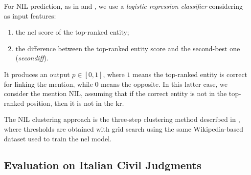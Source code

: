 For NIL prediction, as in \textcite{ijckg2022} and , we use a \textit{logistic regression classifier} considering as input features:
\begin{enumerate}
    \item the \ac{nel} score of the top-ranked entity;
    \item the difference between the top-ranked entity score and the second-best one (\textit{secondiff}).
\end{enumerate}
It produces an output $p \in [0,1]$, where $1$ means the top-ranked entity is correct for linking the mention, while $0$ means the opposite. In this latter case, we consider the mention NIL, assuming that if the correct entity is not in the top-ranked position, then it is not in the \ac{kr}.


The NIL clustering approach is the three-step clustering method described in , where thresholds are obtained with grid search using the same Wikipedia-based dataset used to train the \ac{nel} model.







\subsection{Evaluation on Italian Civil Judgments}
\label{sec:experiments}

